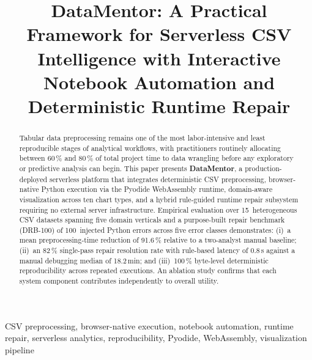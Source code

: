 \documentclass[conference]{IEEEtran}
\begin{document}
\title{DataMentor: A Practical Framework for Serverless CSV
       Intelligence with Interactive Notebook Automation
       and Deterministic Runtime Repair}

\author{%
}

\maketitle

\begin{abstract}
Tabular data preprocessing remains one of the most labor-intensive
and least reproducible stages of analytical workflows, with practitioners
routinely allocating between 60\,\% and 80\,\% of total project time to
data wrangling before any exploratory or predictive analysis can begin.
This paper presents \textbf{DataMentor}, a production-deployed serverless
platform that integrates deterministic CSV preprocessing, browser-native
Python execution via the Pyodide WebAssembly runtime, domain-aware
visualization across ten chart types, and a hybrid rule-guided runtime
repair subsystem requiring no external server infrastructure. Empirical
evaluation over 15~heterogeneous CSV datasets spanning five domain
verticals and a purpose-built repair benchmark (DRB-100) of 100~injected
Python errors across five error classes demonstrates: (i)~a mean
preprocessing-time reduction of 91.6\,\% relative to a two-analyst
manual baseline; (ii)~an 82\,\% single-pass repair resolution rate with
rule-based latency of 0.8\,s against a manual debugging median of
18.2\,min; and (iii)~100\,\% byte-level deterministic reproducibility
across repeated executions. An ablation study confirms that each system
component contributes independently to overall utility.
\end{abstract}

\begin{IEEEkeywords}
CSV preprocessing, browser-native execution, notebook automation,
runtime repair, serverless analytics, reproducibility, Pyodide,
WebAssembly, visualization pipeline
\end{IEEEkeywords}
\end{document}
